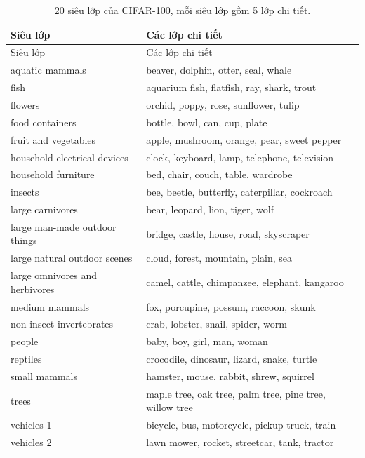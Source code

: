 \documentclass[12pt]{article}
\begin{document}
\begin{xltabular}{\linewidth}{@{}P{5.2cm}L@{}}
\caption{20 siêu lớp của CIFAR-100, mỗi siêu lớp gồm 5 lớp chi tiết.}\label{tab:coarse}\\
\toprule Siêu lớp & Các lớp chi tiết \\\midrule
\endfirsthead
\toprule Siêu lớp & Các lớp chi tiết \\\midrule
\endhead
\bottomrule
\endlastfoot
aquatic mammals & beaver, dolphin, otter, seal, whale \\
fish & aquarium fish, flatfish, ray, shark, trout \\
flowers & orchid, poppy, rose, sunflower, tulip \\
food containers & bottle, bowl, can, cup, plate \\
fruit and vegetables & apple, mushroom, orange, pear, sweet pepper \\
household electrical devices & clock, keyboard, lamp, telephone, television \\
household furniture & bed, chair, couch, table, wardrobe \\
insects & bee, beetle, butterfly, caterpillar, cockroach \\
large carnivores & bear, leopard, lion, tiger, wolf \\
large man-made outdoor things & bridge, castle, house, road, skyscraper \\
large natural outdoor scenes & cloud, forest, mountain, plain, sea \\
large omnivores and herbivores & camel, cattle, chimpanzee, elephant, kangaroo \\
medium mammals & fox, porcupine, possum, raccoon, skunk \\
non-insect invertebrates & crab, lobster, snail, spider, worm \\
people & baby, boy, girl, man, woman \\
reptiles & crocodile, dinosaur, lizard, snake, turtle \\
small mammals & hamster, mouse, rabbit, shrew, squirrel \\
trees & maple tree, oak tree, palm tree, pine tree, willow tree \\
vehicles 1 & bicycle, bus, motorcycle, pickup truck, train \\
vehicles 2 & lawn mower, rocket, streetcar, tank, tractor \\
\end{xltabular}

\end{document}
